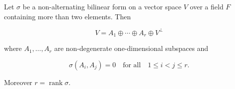 Let $\sigma$ be a non-alternating bilinear form on a vector space $V$ over a field $F$ containing more than two elements. Then

$$V = A_1 \oplus \cdots \oplus A_r \oplus V^\perp$$

where $A_1, \ldots, A_r$ are non-degenerate one-dimensional subspaces and

$$\sigma(A_i, A_j) = 0 \quad \text{for all} \quad 1 \leq i < j \leq r.$$

Moreover $r = \operatorname{rank} \sigma$.
